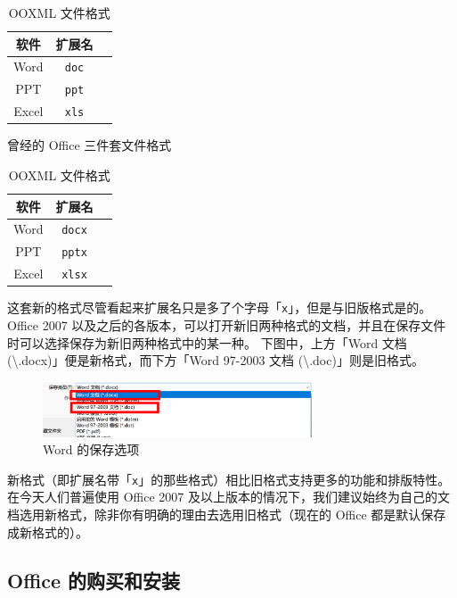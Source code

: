 \begin{table}[htb!]
  \begin{minipage}{7.5cm}
    \centering\begin{tabular}{ccc}
      \toprule
      软件 & 扩展名 \\
      \midrule
      Word & \verb|doc| \\
      PPT & \verb|ppt| \\
      Excel & \verb|xls| \\
      \bottomrule
    \end{tabular}
    \caption{曾经的 Office 三件套文件格式}
    \label{Old_Office_File_Format}
  \end{minipage}
  \begin{minipage}{6cm}
    \centering\begin{tabular}{ccc}
      \toprule
      软件 & 扩展名 \\
      \midrule
      Word & \verb|docx| \\
      PPT & \verb|pptx| \\
      Excel & \verb|xlsx| \\
      \bottomrule
    \end{tabular}
    \caption{OOXML 文件格式}
    \label{OOXML_File_Format}
  \end{minipage}
\end{table}

这套新的格式尽管看起来扩展名只是多了个字母「\verb|x|」，但是与旧版格式是的。
Office 2007 以及之后的各版本，可以打开新旧两种格式的文档，并且在保存文件时可以选择保存为新旧两种格式中的某一种。
下图中，上方「Word 文档 (\textbackslash\*.docx)」便是新格式，而下方「Word 97-2003 文档 (\textbackslash\*.doc)」则是旧格式。

\begin{figure}[htb!]
  \centering
  \includegraphics[width=8cm]{assets/Word_formats.png}
  \caption{Word 的保存选项}
  \label{Word_Formats}
\end{figure}

新格式（即扩展名带「\verb|x|」的那些格式）相比旧格式支持更多的功能和排版特性。
在今天人们普遍使用 Office 2007 及以上版本的情况下，我们建议始终为自己的文档选用新格式，除非你有明确的理由去选用旧格式（现在的 Office 都是默认保存成新格式的）。

\subsection{Office 的购买和安装}

